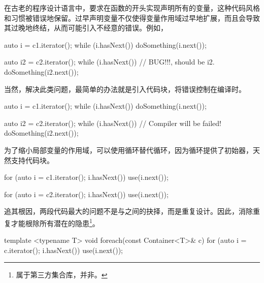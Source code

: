 \begin{content}
\begin{story}
\begin{content}

在古老的程序设计语言中，要求在函数的开头实现声明所有的变量，这种代码风格和习惯被错误地保留。过早声明变量不仅使得变量作用域过早地扩展，而且会导致其过晚地终结，从而可能引入不经意的错误。例如，

\begin{leftbar}
 \begin{c++}[caption={\ttfamily{while循环}}]
auto i = c1.iterator();
while (i.hasNext()) {
  doSomething(i.next());
}

auto i2 = c2.iterator();
while (i.hasNext()) {           // BUG!!!, should be i2.
  doSomething(i2.next());
}
 \end{c++}
\end{leftbar}

当然，解决此类问题，最简单的办法就是引入代码块，将错误控制在编译时。

\begin{leftbar}
 \begin{c++}[caption={\ttfamily{while循环}}]
{
  auto i = c1.iterator();
  while (i.hasNext()) {
    doSomething(i.next());
  }
}

{
  auto i2 = c2.iterator();
  while (i.hasNext()) {           // Compiler will be failed!
    doSomething(i2.next());
  }
}
 \end{c++}
\end{leftbar}

为了缩小局部变量的作用域，可以使用循环替代循环，因为循环提供了初始器，天然支持代码块。

\begin{leftbar}
 \begin{c++}[caption={\ttfamily{for循环}}]
for (auto i = c1.iterator(); i.hasNext()) {
  use(i.next());
}

for (auto i = c2.iterator(); i.hasNext()) {
  use(i.next());
}
 \end{c++}
\end{leftbar}

追其根因，两段代码最大的问题不是与之间的抉择，而是重复设计。因此，消除重复才能根除所有潜在的隐患\footnote{属于第三方集合库，并非。}。

\begin{leftbar}
 \begin{c++}[caption={\ttfamily{for循环}}]
template <typename T>
void foreach(const Container<T>& c) {
  for (auto i = c.iterator(); i.hasNext()) {
    use(i.next());
  } 
}
 \end{c++}
\end{leftbar}


\end{content}
\end{story}
\end{content}
